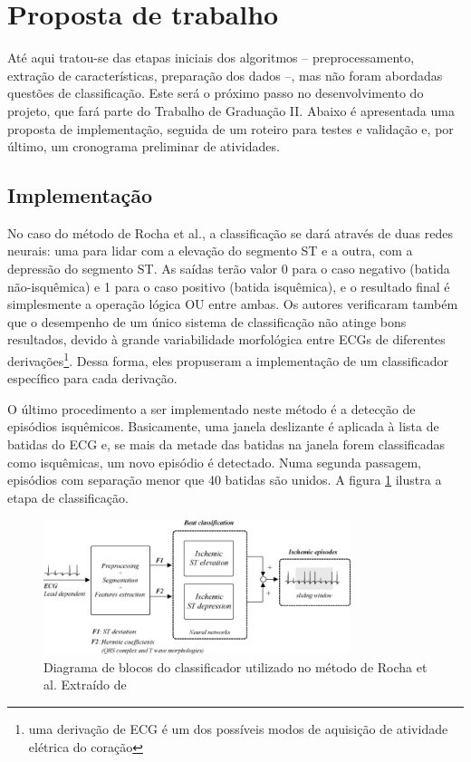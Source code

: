 
\section{Proposta de trabalho}
\label{sec:section5}
Até aqui tratou-se das etapas iniciais dos algoritmos -- preprocessamento, extração de características, preparação dos dados --, mas não foram abordadas questões de classificação. Este será o próximo passo no desenvolvimento do projeto, que fará parte do Trabalho de Graduação II. Abaixo é apresentada uma proposta de implementação, seguida de um roteiro para testes e validação e, por último, um cronograma preliminar de atividades.

\subsection{Implementação}
No caso do método de Rocha et al., a classificação se dará através de duas redes neurais: uma para lidar com a elevação do segmento ST e a outra, com a depressão do segmento ST. As saídas terão valor 0 para o caso negativo (batida não-isquêmica) e 1 para o caso positivo (batida isquêmica), e o resultado final é simplesmente a operação lógica OU entre ambas. Os autores verificaram também que o desempenho de um único sistema de classificação não atinge bons resultados, devido à grande variabilidade morfológica entre ECGs de diferentes derivações\footnote{uma derivação de ECG é um dos possíveis modos de aquisição de atividade elétrica do coração}. Dessa forma, eles propuseram a implementação de um classificador específico para cada derivação.

O último procedimento a ser implementado neste método é a detecção de episódios isquêmicos. Basicamente, uma janela deslizante é aplicada à lista de batidas do ECG e, se mais da metade das batidas na janela  forem classificadas como isquêmicas, um novo episódio é detectado. Numa segunda passagem, episódios com separação menor que 40 batidas são unidos. A figura \ref{fig:rocha_03} ilustra a etapa de classificação.

\begin{figure}[ht]
    \centering
    \includegraphics[width=0.8\textwidth]{figures/rocha_03.png}
    \caption{Diagrama de blocos do classificador utilizado no método de Rocha et al. Extraído de \cite{Rocha10}}
    \label{fig:rocha_03}
\end{figure}

